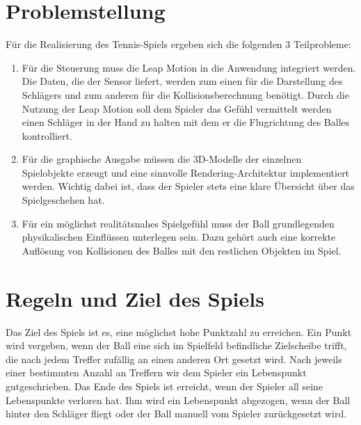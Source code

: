 \section{Problemstellung}
\label{Aufbau_der_Arbeit}
%
Für die Realisierung des Tennis-Spiels ergeben sich die folgenden 3 Teilprobleme:
\begin{enumerate}
	\item Für die Steuerung muss die Leap Motion in die Anwendung integriert werden. Die Daten, die der Sensor liefert, werden zum einen für die Darstellung des Schlägers und zum anderen für die Kollisionsberechnung benötigt. Durch die Nutzung der Leap Motion soll dem Spieler das Gefühl vermittelt werden einen Schläger in der Hand zu halten mit dem er die Flugrichtung des Balles kontrolliert.
	\item Für die graphische Ausgabe müssen die 3D-Modelle der einzelnen Spielobjekte erzeugt und eine sinnvolle Rendering-Architektur implementiert werden. Wichtig dabei ist, dass der Spieler stets eine klare Übersicht über das Spielgeschehen hat.
	\item Für ein möglichst realitätsnahes Spielgefühl muss der Ball grundlegenden physikalischen Einflüssen unterlegen sein. Dazu gehört auch eine korrekte Auflösung von Kollisionen des Balles mit den restlichen Objekten im Spiel.
\end{enumerate}

\section{Regeln und Ziel des Spiels}
Das Ziel des Spiels ist es, eine möglichst hohe Punktzahl zu erreichen. Ein Punkt wird vergeben, wenn der Ball eine sich im Spielfeld befindliche Zielscheibe trifft, die nach jedem Treffer zufällig an einen anderen Ort gesetzt wird. Nach jeweils einer bestimmten Anzahl an Treffern wir dem Spieler ein Lebenspunkt gutgeschrieben. Das Ende des Spiels ist erreicht, wenn der Spieler all seine Lebenspunkte verloren hat. Ihm wird ein Lebenspunkt abgezogen, wenn der Ball hinter den Schläger fliegt oder der Ball manuell vom Spieler zurückgesetzt wird. 

